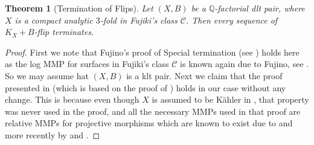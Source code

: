 \documentclass[12pt]{amsart}
\theoremstyle{plain}
\newtheorem{theorem}{Theorem}[section]
\theoremstyle{remark}
\theoremstyle{definition}
\newcommand{\<}{\leq}
\newcommand{\mbQ}{\mathbb{Q}}
\def\mcC{\mathcal{C}}
\theoremstyle{definition}
\theoremstyle{definition}
\numberwithin{equation}{section}
\theoremstyle{remark}
\begin{document}
\begin{theorem}[Termination of Flips]\label{thm:termination}
    Let $(X, B)$ be a $\mbQ$-factorial dlt pair, where $X$ is a compact analytic $3$-fold in Fujiki's class $\mcC$. Then every sequence of $K_X+B$-flip terminates.
\end{theorem}

\begin{proof}
First we note that Fujino's proof of Special termination (see \cite{Fuj07}) holds here as the log MMP for surfaces in Fujiki's class $\mcC$ is known again due to Fujino, see \cite{Fuj21}. So we may assume hat $(X, B)$ is a klt pair. Next we claim that the proof presented in \cite[Theorem 3.3]{DO23} (which is based on the proof of \cite{Kaw92}) holds in our case without any change. This is because even though $X$ is assumed to be K\"ahler in \cite{DO23}, that property was never used in the proof, and all the necessary MMPs used in that proof are relative MMPs for projective morphisms which are known to exist due to \cite{Nak87} and more recently by \cite{Fuj22} and \cite{DHP22}. 
\end{proof}
\end{document}
